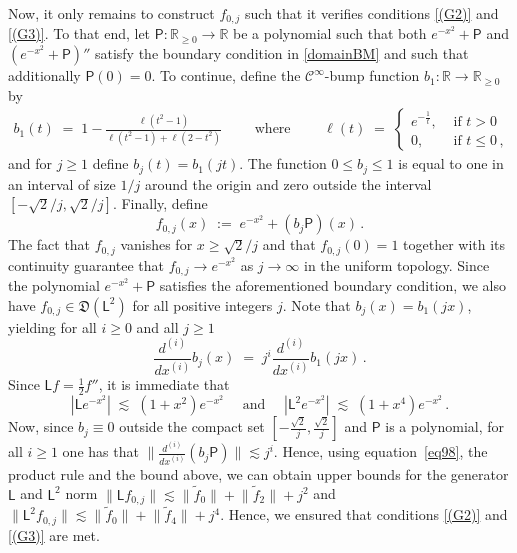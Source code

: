 \documentclass[12pt,a4paper]{article}
\theoremstyle{plain}
\theoremstyle{remark}
\newcommand{\msf}[1]{{\mathsf #1}}
\newcommand{\mc}[1]{{\mathcal #1}}
\newcommand{\mf}[1]{{\mathfrak #1}}
\newcommand{\bb}[1]{{\mathbb #1}}
\newcommand{\norm}[1]{\lVert#1\rVert}
\begin{document}
	Now, it only remains to construct $f_{0,j}$ such that it verifies conditions \ref{(G2)} and  \ref{(G3)}. To that end, let $\msf{P}:\bb{R}_{\geq 0} \to \bb{R}$ be a polynomial such that
	both $e^{-x^2}+\msf{P}$ and $(e^{-x^2}+\msf{P})''$ satisfy the boundary condition in \eqref{domainBM} and such that additionally $\msf{P}(0)=0$.
	To continue, define the $\mc C^\infty$-bump function $b_1: \bb{R} \to \bb{R}_{\geq 0}$ by
	\begin{align*}
		b_1(t) \;=\; 1 -  \frac{\ell(t^2-1)}{\ell(t^2-1) + \ell(2-t^2)}
		\qquad \text{ where }
		\qquad
		\ell(t) \;=\;
		\begin{cases}
			e^{-\frac{1}{t}}, &\text{ if } t > 0\\
			0, &\text{ if } t \leq 0\,,
		\end{cases}
	\end{align*}
	and for $j\geq 1$ define $b_j(t)=b_1(jt)$.
	The function $0\leq b_j\leq 1$ is equal to one in an interval of size $1/j$ around the origin and zero outside the interval $[-\sqrt{2}/j,\sqrt{2}/j]$.
	Finally,  define
	\begin{equation*}
		f_{0,j}(x) \;:=\; e^{-x^2} + (b_j\msf{P})(x)\,.
	\end{equation*}
	The fact that $f_{0,j}$ vanishes for $x\geq \sqrt{2}/j$ and that $f_{0,j}(0)=1$ together with its continuity guarantee that $f_{0,j} \to e^{-x^2}$ as $j \to \infty$ in the uniform topology. Since the polynomial $e^{-x^2}+ \msf{P}$ satisfies the aforementioned boundary condition,  we also have $f_{0,j} \in \mf{D}(\msf{L}^2)$ for all positive integers $j$. Note that $b_j(x) = b_1(jx)$, yielding for all $i\geq 0$ and all $j\geq 1$
	\begin{equation*}
		\frac{d^{(i)}}{dx^{(i)}}b_j(x) \;=\; j^{i}\frac{d^{(i)}}{dx^{(i)}}b_1(jx)\,.
	\end{equation*}
	Since $\msf{L}f = \frac{1}{2}f ''$, it is immediate that
	\begin{equation}\label{eq98}
		|\msf{L}e^{-x^2}| \;\lesssim\; (1+x^2)e^{-x^2}\quad \text{ and }\quad |\msf{L}^2e^{-x^2}| \;\lesssim\; (1+x^4)e^{-x^2}\,.
	\end{equation}
	Now, since $b_j \equiv 0$ outside the compact set $[-\frac{\sqrt{2}}{j}, \frac{\sqrt{2}}{j}]$ and $\msf{P}$ is a polynomial, for all $i\geq 1$ one has that $\norm{\frac{d^{(i)}}{dx^{(i)}} (b_j\msf{P})} \lesssim j^i$.
	Hence, using equation~\eqref{eq98}, the product rule and the bound above, we can obtain upper bounds for the generator $\msf{L}$ and $\msf{L}^2$ norm
	$
	\norm{\msf{L}f_{0,j}} \lesssim \norm{\tilde{f}_0} + \norm{\tilde{f}_2} + j^2$
	and
	$\norm{\msf{L}^2f_{0, j}} \lesssim \norm{\tilde{f}_0} + \norm{\tilde{f}_4} + j^4
	$.
	Hence, we ensured that conditions \ref{(G2)} and  \ref{(G3)} are met.
	
\end{document}
